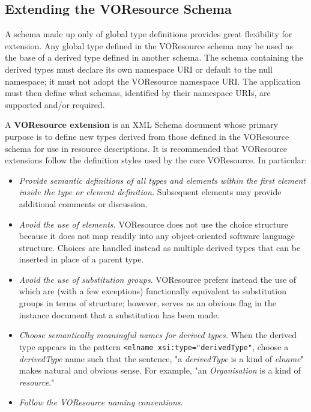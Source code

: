 \documentclass[11pt,a4paper]{ivoa}
\begin{document}
\subsection{Extending the VOResource Schema}

\label{sect:extending}

A schema made up only of global type definitions provides great
flexibility for extension.  Any global type defined in the VOResource
schema may be used as the base of a derived type defined in another
schema.  The schema containing the derived types must declare its own
namespace URI or default to the null namespace; it must not adopt the
VOResource namespace URI.  The application must then define what
schemas, identified by their namespace URIs, are supported and/or
required.  



A \textbf{VOResource extension} is an XML Schema document whose primary
purpose is to define new types derived from those defined in the
VOResource schema for use in resource descriptions.  It is recommended
that VOResource extensions follow the definition styles used by the core
VOResource.  In particular: 

\begin{itemize}
  \item \emph{Provide semantic definitions of all types and elements within
       the first  element inside
       the type or element definition.}  Subsequent
        elements may provide
       additional comments or discussion.  

  \item \emph{Avoid the use of  elements.}
       VOResource does not use the choice structure because it does
       not map readily into any object-oriented software language
       structure.  Choices are handled instead as multiple derived
       types that can be inserted in place of a parent type.  

  \item \emph{Avoid the use of substitution groups}.  VOResource
       prefers instead the use of  which are
       (with a few exceptions) functionally equivalent to substitution
       groups in terms of structure; however, 
       serves as an obvious flag in the instance document that a
       substitution has been made. 

  \item \emph{Choose semantically meaningful names for derived
       types.}  When the derived type appears in the pattern
       \verb|<elname xsi:type="derivedType"|,
       choose a \textit{derivedType} name such that the sentence, "a
       \textit{derivedType} is a kind of \textit{elname}" makes natural
       and obvious sense.  For example, "an \textit{Organisation} is a
       kind of \textit{resource}." 

  \item \emph{Follow the VOResource naming conventions}. 
\end{itemize}
\end{document}
